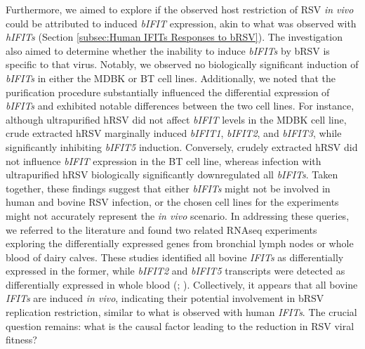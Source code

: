 Furthermore, we aimed to explore if the observed host restriction of RSV \textit{in vivo} could be attributed to induced \textit{bIFIT} expression, akin to what was observed with \textit{hIFITs} (Section \ref{subsec:Human IFITs Responses to bRSV}). The investigation also aimed to determine whether the inability to induce \textit{bIFITs} by bRSV is specific to that virus. Notably, we observed no biologically significant induction of \textit{bIFITs} in either the MDBK or BT cell lines. Additionally, we noted that the purification procedure substantially influenced the differential expression of \textit{bIFITs} and exhibited notable differences between the two cell lines. For instance, although ultrapurified hRSV did not affect \textit{bIFIT} levels in the MDBK cell line, crude extracted hRSV marginally induced \textit{bIFIT1}, \textit{bIFIT2}, and \textit{bIFIT3}, while significantly inhibiting \textit{bIFIT5} induction. Conversely, crudely extracted hRSV did not influence \textit{bIFIT} expression in the BT cell line, whereas infection with ultrapurified hRSV biologically significantly downregulated all \textit{bIFITs}. Taken together, these findings suggest that either \textit{bIFITs} might not be involved in human and bovine RSV infection, or the chosen cell lines for the experiments might not accurately represent the \textit{in vivo} scenario. In addressing these queries, we referred to the literature and found two related RNAseq experiments exploring the differentially expressed genes from bronchial lymph nodes or whole blood of dairy calves. These studies identified all bovine \textit{IFITs} as differentially expressed in the former, while \textit{bIFIT2} and \textit{bIFIT5} transcripts were detected as differentially expressed in whole blood (\cite{Johnston2019ExperimentalResponse.}; \cite{Johnston2021MessengerCalves}). Collectively, it appears that all bovine \textit{IFITs} are induced \textit{in vivo}, indicating their potential involvement in bRSV replication restriction, similar to what is observed with human \textit{IFITs}. The crucial question remains: what is the causal factor leading to the reduction in RSV viral fitness?


